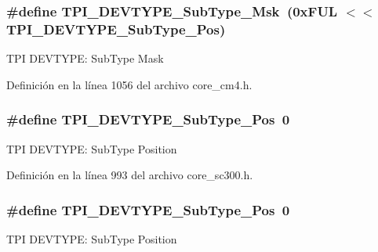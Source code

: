 \subsubsection[{\texorpdfstring{T\+P\+I\+\_\+\+D\+E\+V\+T\+Y\+P\+E\+\_\+\+Sub\+Type\+\_\+\+Msk}{TPI_DEVTYPE_SubType_Msk}}]{\setlength{\rightskip}{0pt plus 5cm}\#define T\+P\+I\+\_\+\+D\+E\+V\+T\+Y\+P\+E\+\_\+\+Sub\+Type\+\_\+\+Msk~(0x\+F\+U\+L $<$$<$ T\+P\+I\+\_\+\+D\+E\+V\+T\+Y\+P\+E\+\_\+\+Sub\+Type\+\_\+\+Pos)}\hypertarget{group___c_m_s_i_s___t_p_i_ga5b2fd7dddaf5f64855d9c0696acd65c1}{}\label{group___c_m_s_i_s___t_p_i_ga5b2fd7dddaf5f64855d9c0696acd65c1}
T\+PI D\+E\+V\+T\+Y\+PE\+: Sub\+Type Mask 

Definición en la línea 1056 del archivo core\+\_\+cm4.\+h.

\subsubsection[{\texorpdfstring{T\+P\+I\+\_\+\+D\+E\+V\+T\+Y\+P\+E\+\_\+\+Sub\+Type\+\_\+\+Pos}{TPI_DEVTYPE_SubType_Pos}}]{\setlength{\rightskip}{0pt plus 5cm}\#define T\+P\+I\+\_\+\+D\+E\+V\+T\+Y\+P\+E\+\_\+\+Sub\+Type\+\_\+\+Pos~0}\hypertarget{group___c_m_s_i_s___t_p_i_ga0c799ff892af5eb3162d152abc00af7a}{}\label{group___c_m_s_i_s___t_p_i_ga0c799ff892af5eb3162d152abc00af7a}
T\+PI D\+E\+V\+T\+Y\+PE\+: Sub\+Type Position 

Definición en la línea 993 del archivo core\+\_\+sc300.\+h.

\subsubsection[{\texorpdfstring{T\+P\+I\+\_\+\+D\+E\+V\+T\+Y\+P\+E\+\_\+\+Sub\+Type\+\_\+\+Pos}{TPI_DEVTYPE_SubType_Pos}}]{\setlength{\rightskip}{0pt plus 5cm}\#define T\+P\+I\+\_\+\+D\+E\+V\+T\+Y\+P\+E\+\_\+\+Sub\+Type\+\_\+\+Pos~0}\hypertarget{group___c_m_s_i_s___t_p_i_ga0c799ff892af5eb3162d152abc00af7a}{}\label{group___c_m_s_i_s___t_p_i_ga0c799ff892af5eb3162d152abc00af7a}
T\+PI D\+E\+V\+T\+Y\+PE\+: Sub\+Type Position 

